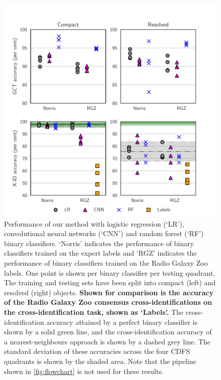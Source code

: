 \documentclass[fleqn,usenatbib,usedcolumn]{mnras}
\newcommand{\edited}[1]{{\bf {#1}}}
\begin{document}
    \begin{figure}
    \centering
    \includegraphics[]{images/cdfs-grid-new.pdf}
    \caption{Performance of our method with logistic regression (`LR'), convolutional neural networks (`CNN') and random forest (`RF') binary classifiers. `Norris' indicates the performance of binary classifiers trained on the expert labels and `RGZ' indicates the performance of binary classifiers trained on the Radio Galaxy Zoo labels. One point is shown per binary classifier per testing quadrant. The training and testing sets have been split into compact (left) and resolved (right) objects. \edited{Shown for comparison is the accuracy of the Radio Galaxy Zoo consensus cross-identifications on the cross-identification task, shown as `Labels'.} The cross-identification accuracy attained by a perfect binary classifier is shown by a solid green line, and the cross-identification accuracy of a nearest-neighbours approach is shown by a dashed grey line. The standard deviation of these accuracies across the four CDFS quadrants is shown by the shaded area. Note that the pipeline shown in \autoref{fig:flowchart} is not used for these results. \label{fig:ba}}
    \end{figure}
\end{document}
